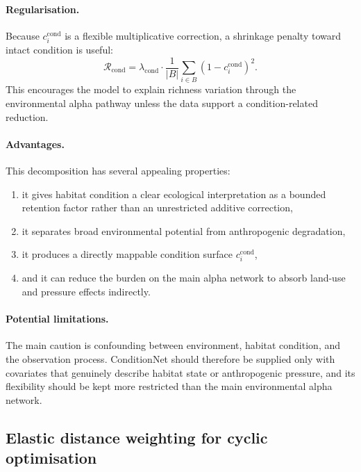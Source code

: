 \documentclass{article}
\begin{document}
\paragraph{Regularisation.}
Because \(c_i^{\mathrm{cond}}\) is a flexible multiplicative correction, a shrinkage penalty toward intact condition is useful:
\begin{equation}
    \mathcal{R}_{\mathrm{cond}}
    =
    \lambda_{\mathrm{cond}}
    \cdot
    \frac{1}{|B|}
    \sum_{i \in B}
    \left(1 - c_i^{\mathrm{cond}}\right)^2.
\end{equation}
This encourages the model to explain richness variation through the environmental alpha pathway unless the data support a condition-related reduction.

\paragraph{Advantages.}
This decomposition has several appealing properties:
\begin{enumerate}
    \item it gives habitat condition a clear ecological interpretation as a bounded retention factor rather than an unrestricted additive correction,
    \item it separates broad environmental potential from anthropogenic degradation,
    \item it produces a directly mappable condition surface \(c_i^{\mathrm{cond}}\),
    \item and it can reduce the burden on the main alpha network to absorb land-use and pressure effects indirectly.
\end{enumerate}

\paragraph{Potential limitations.}
The main caution is confounding between environment, habitat condition, and the observation process. ConditionNet should therefore be supplied only with covariates that genuinely describe habitat state or anthropogenic pressure, and its flexibility should be kept more restricted than the main environmental alpha network.

\subsection{Elastic distance weighting for cyclic optimisation}
\label{sec:elastic-weighting}
\end{document}
